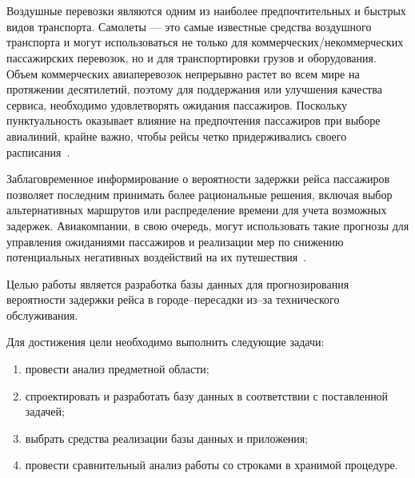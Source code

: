 \newpage
{}
\chapter*{}

Воздушные перевозки являются одним из наиболее предпочтительных и быстрых видов транспорта.
Самолеты --- это самые известные средства воздушного транспорта и могут использоваться не только для коммерческих/некоммерческих пассажирских перевозок, но и для транспортировки грузов и оборудования.
Объем коммерческих авиаперевозок непрерывно растет во всем мире на протяжении десятилетий, поэтому для поддержания или улучшения качества сервиса, необходимо удовлетворять ожидания пассажиров.
Поскольку пунктуальность оказывает влияние на предпочтения пассажиров при выборе авиалиний, крайне важно, чтобы рейсы четко придерживались своего расписания~\cite{tat}.

Заблаговременное информирование о вероятности задержки рейса пассажиров позволяет последним принимать более рациональные решения, включая выбор альтернативных маршрутов или распределение времени для учета возможных задержек.
Авиакомпании, в свою очередь, могут использовать такие прогнозы для управления ожиданиями пассажиров и реализации мер по снижению потенциальных негативных воздействий на их путешествия~\cite{trt}.

Целью работы является разработка базы данных для прогнозирования вероятности задержки рейса в городе--пересадки из--за технического обслуживания.

Для достижения цели необходимо выполнить следующие задачи:
\begin{enumerate}[label=\arabic*)]
    \item провести анализ предметной области;
    \item спроектировать и разработать базу данных в соответствии с поставленной задачей;
    \item выбрать средства реализации базы данных и приложения;
    \item провести сравнительный анализ работы со строками в хранимой процедуре.
\end{enumerate}